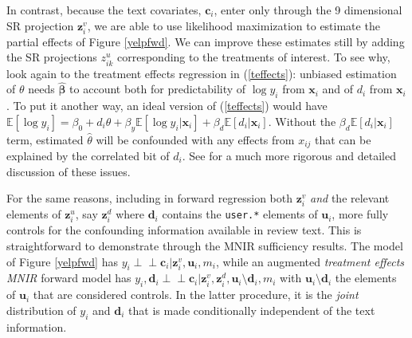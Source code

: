 \documentclass[12pt]{article}
\newcommand{\bs}[1]{\boldsymbol{#1}}
\newcommand{\bm}[1]{\mathbf{#1}}
\newcommand{\ds}[1]{\mathds{#1}}
\newcommand{\indep}{\perp\!\!\!\perp}
\newcommand{\cd}[1]{{\tt#1}}
\begin{document}
In contrast, because the text covariates, $\bm{c}_i$, enter only through the 9
dimensional SR projection $\bm{z}^v_i$, we are able to use likelihood maximization
 to estimate the partial effects of Figure \ref{yelpfwd}.
We can improve these estimates still by adding the SR
projections $z^u_{ik}$ corresponding to the treatments of interest.    To see why, look
again to the treatment effects regression in (\ref{teffects}): 
unbiased estimation of $\theta$ needs $\bs{\hat\beta}$ to account both for
predictability of $\log y_i$ from $\bm{x}_i$ and of $d_i$ from $\bm{x}_i$.  To
put it another way, an ideal version of (\ref{teffects}) would have $\ds{E}[\log y_i] = \beta_0 + d_i\theta  + \beta_y \ds{E}[\log y_i
| \bm{x}_i] + \beta_d \ds{E}[d_i | \bm{x}_i]$.  Without the $\beta_d \ds{E}[d_i | \bm{x}_i]$ 
term, estimated $\hat\theta$ will be confounded with any effects from
$x_{ij}$ that can be explained by the correlated bit of $d_i$.  See
\citet{belloni_inference_2012} for a much more rigorous and detailed
discussion of these issues.

For the same reasons, including in forward regression both $\bm{z}_i^v$ {\it
and} the relevant elements of $\bm{z}_i^u$, say $\bm{z}_i^d$ where $\bm{d}_i$
contains the \cd{user.*} elements of $\bm{u}_i$, more fully controls for the
confounding information available in review text. This is straightforward to
demonstrate through the MNIR sufficiency results.  The model of Figure
\ref{yelpfwd} has $y_i \indep \bm{c}_i | \bm{z}^v_i, \bm{u}_i, m_i$, while an
augmented {\it treatment effects MNIR} forward model has $y_i, \bm{d}_i \indep
\bm{c}_i | \bm{z}^v_i,\bm{z}^d_i, \bm{u}_i\!\setminus\!\bm{d}_i, m_i$ with
$\bm{u}_i\!\setminus\!\bm{d}_i$ the  elements of $\bm{u}_i$ that are
considered controls. In the latter procedure, it is  the {\it joint}
distribution of $y_i$ and $\bm{d}_i$ that is made conditionally independent of
the text information.
\end{document}
